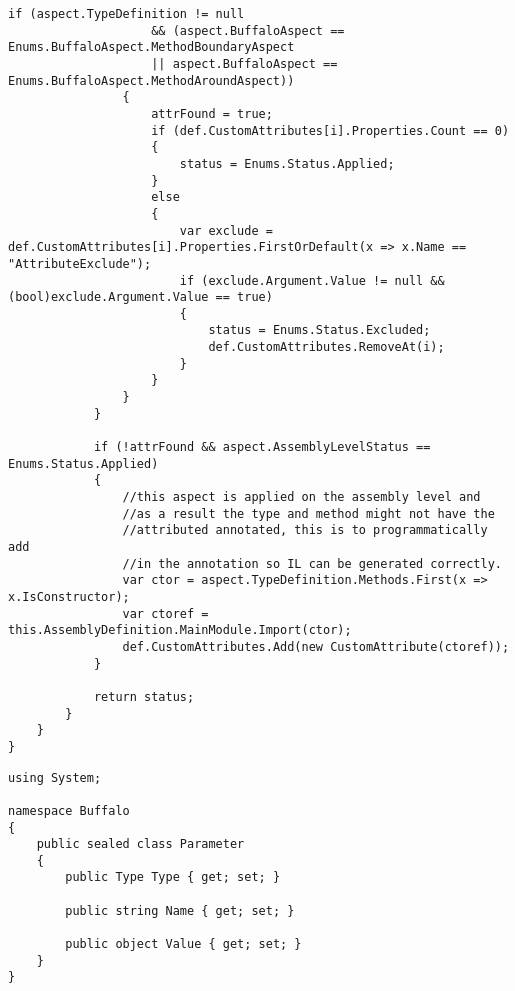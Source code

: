 \begin{lstlisting}[caption={../buffalo/Weaver.cs}, label=../buffalo/Weaver.cs, frame=tb, basicstyle=\scriptsize]
                if (aspect.TypeDefinition != null
                    && (aspect.BuffaloAspect == Enums.BuffaloAspect.MethodBoundaryAspect
                    || aspect.BuffaloAspect == Enums.BuffaloAspect.MethodAroundAspect))
                {
                    attrFound = true;
                    if (def.CustomAttributes[i].Properties.Count == 0)
                    {
                        status = Enums.Status.Applied;
                    }
                    else
                    {
                        var exclude = def.CustomAttributes[i].Properties.FirstOrDefault(x => x.Name == "AttributeExclude");
                        if (exclude.Argument.Value != null && (bool)exclude.Argument.Value == true)
                        {
                            status = Enums.Status.Excluded;
                            def.CustomAttributes.RemoveAt(i);
                        }
                    }
                }
            }

            if (!attrFound && aspect.AssemblyLevelStatus == Enums.Status.Applied)
            {
                //this aspect is applied on the assembly level and
                //as a result the type and method might not have the
                //attributed annotated, this is to programmatically add
                //in the annotation so IL can be generated correctly.
                var ctor = aspect.TypeDefinition.Methods.First(x => x.IsConstructor);
                var ctoref = this.AssemblyDefinition.MainModule.Import(ctor);
                def.CustomAttributes.Add(new CustomAttribute(ctoref));
            }

            return status;
        }
    }
}\end{lstlisting}

\begin{lstlisting}[caption={../buffalo/Parameter.cs}, label=../buffalo/Parameter.cs, frame=tb, basicstyle=\scriptsize]﻿using System;

namespace Buffalo
{
    public sealed class Parameter
    {
        public Type Type { get; set; }

        public string Name { get; set; }

        public object Value { get; set; }
    }
}
\end{lstlisting}

